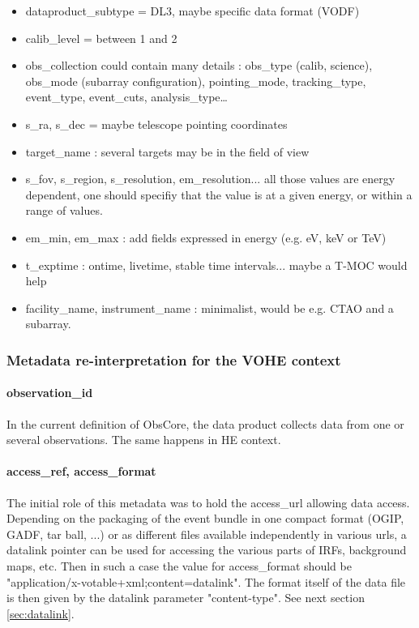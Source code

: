 \documentclass[11pt,a4paper]{ivoa}
\begin{document}
\begin{itemize}
    \item dataproduct\_subtype = DL3, maybe specific data format (VODF)
    \item calib\_level = between 1 and 2
    \item obs\_collection could contain many details : obs\_type (calib, science), obs\_mode (subarray
configuration), pointing\_mode, tracking\_type, event\_type, event\_cuts, analysis\_type…
    \item s\_ra, s\_dec = maybe telescope pointing coordinates
    \item target\_name : several targets may be in the field of view
    \item s\_fov, s\_region, s\_resolution, em\_resolution... all those values are energy dependent, one should specifiy that the value is at a given energy, or within a range of values.
    \item em\_min, em\_max : add fields expressed in energy (e.g. eV, keV or TeV)
    \item t\_exptime : ontime, livetime, stable time intervals... maybe a T-MOC would help
    \item facility\_name, instrument\_name : minimalist, would be e.g. CTAO and a subarray.
\end{itemize}


\subsubsection{Metadata re-interpretation for the VOHE context}

\paragraph{observation\_id}
In the current definition of ObsCore, the data product collects data from one or several observations. The same happens in HE context.

\paragraph{access\_ref, access\_format}
The initial role of this metadata was to hold the access\_url allowing data access.
Depending on the packaging of the event bundle in one compact format (OGIP, GADF, tar ball, ...)
or as different files available independently in various urls, a datalink pointer can be used for accessing the various parts of IRFs, background maps, etc.
Then in such a case the value for access\_format should be "application/x-votable+xml;content=datalink". The format itself of the data file is then given by the datalink parameter "content-type".
See next section \ref{sec:datalink}.
\end{document}
